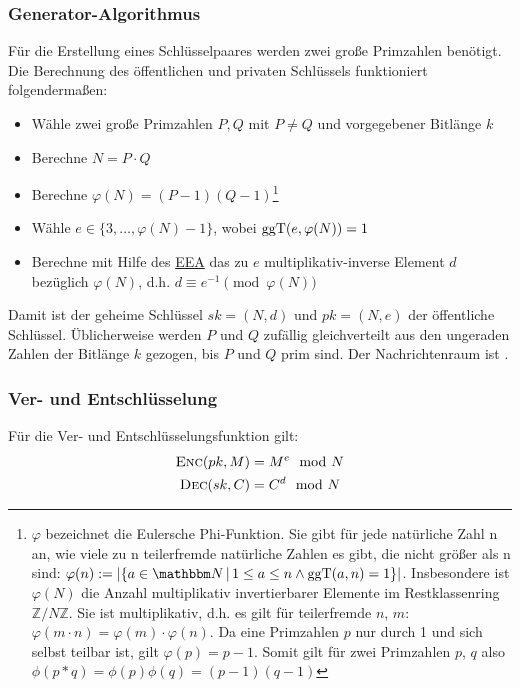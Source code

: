\subsubsection{Generator-Algorithmus}
Für die Erstellung eines Schlüsselpaares werden zwei große Primzahlen benötigt. Die Berechnung des öffentlichen und privaten Schlüssels funktioniert folgendermaßen:
\begin{itemize}
 	\item Wähle zwei große Primzahlen $P, Q$ mit $P \neq Q$ und vorgegebener Bitlänge $k$
 	\item Berechne $N = P \cdot Q$
 	\item Berechne $\varphi(N) = (P - 1)(Q - 1)$\footnote{$\varphi$
            bezeichnet die Eulersche Phi-Funktion. Sie gibt für jede
            natürliche Zahl n an, wie viele zu n teilerfremde natürliche
            Zahlen es gibt, die nicht größer als n sind: 
            $\varphi(n) := \vert \{a\in\N \, |\, 1 \le a \le n
            \land \operatorname{ggT}(a,n) = 1 \} \vert$. Insbesondere
            ist $\varphi(N)$ die Anzahl multiplikativ invertierbarer
            Elemente im Restklassenring $\mathbb{Z}/N\mathbb{Z}$.
            Sie ist multiplikativ, d.h. es gilt für teilerfremde $n$, $m$:
            $\varphi(m\cdot n) = \varphi(m) \cdot \varphi(n)$. Da eine
            Primzahlen $p$ nur durch 1 und sich selbst teilbar ist, 
            gilt $\varphi(p) = p-1$. Somit gilt für zwei Primzahlen $p$,
            $q$ also $\phi(p*q) = \phi(p) \phi(q) = (p-1)(q-1)$} 
 	\item Wähle $e \in \{3, \dotsc, \varphi(N) - 1\}$, wobei $\operatorname{ggT}(e, \varphi(N)) = 1$
 	\item Berechne mit Hilfe des \hyperref[ssec:eea]{EEA} das zu $e$ multiplikativ-inverse Element $d$ bezüglich $\varphi(N)$, d.h. $d \equiv e^{-1} \pmod{\varphi(N)}$
\end{itemize}

Damit ist der geheime Schlüssel $sk = (N, d)$ und $pk = (N, e)$ der
öffentliche Schlüssel. Üblicherweise werden $P$ und $Q$ zufällig
gleichverteilt aus den ungeraden Zahlen der Bitlänge $k$ gezogen, bis
$P$ und $Q$ prim sind. Der Nachrichtenraum ist . 
\subsubsection{Ver- und Entschlüsselung}
Für die Ver- und
Entschlüsselungsfunktion gilt: 
\begin{align*}
	\textsc{Enc}(pk, M) & = M^e \mod N \\
	\textsc{Dec}(sk, C) & = C^d \mod N  
\end{align*}

